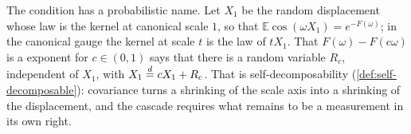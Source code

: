 The condition has a probabilistic name. Let $X_1$ be the random displacement whose law is the
kernel at canonical scale $1$, so that $\mathbb{E}\cos(\omega X_1) = e^{-F(\omega)}$; in the
canonical gauge the kernel at scale $t$ is the law of $tX_1$. That $F(\omega) - F(c\omega)$ is
a \Levy{} exponent for $c \in (0,1)$ says that there is a random variable $R_c$, independent of
$X_1$, with $X_1 \stackrel{d}{=} cX_1 + R_c$. That is self-decomposability
(\ref{def:self-decomposable}): covariance turns a shrinking of the scale axis into a shrinking
of the displacement, and the cascade requires what remains to be a measurement in its own
right.

